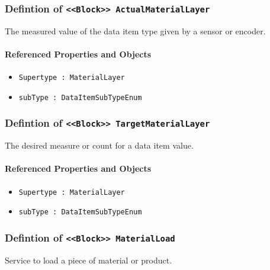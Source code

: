 \subsubsection{Defintion of \texttt{<<Block>> ActualMaterialLayer}}
  \label{type:ActualMaterialLayer}

\FloatBarrier

The measured value of the data item type given by a sensor or encoder.

\FloatBarrier
\paragraph{Referenced Properties and Objects}

\begin{itemize}
\item \texttt{Supertype : MaterialLayer}

\item \texttt{subType : DataItemSubTypeEnum}

\end{itemize}
\FloatBarrier
\subsubsection{Defintion of \texttt{<<Block>> TargetMaterialLayer}}
  \label{type:TargetMaterialLayer}

\FloatBarrier

The desired measure or count for a data item value.

\FloatBarrier
\paragraph{Referenced Properties and Objects}

\begin{itemize}
\item \texttt{Supertype : MaterialLayer}

\item \texttt{subType : DataItemSubTypeEnum}

\end{itemize}
\FloatBarrier
\subsubsection{Defintion of \texttt{<<Block>> MaterialLoad}}
  \label{type:MaterialLoad}

\FloatBarrier

Service to load a piece of material or product.

